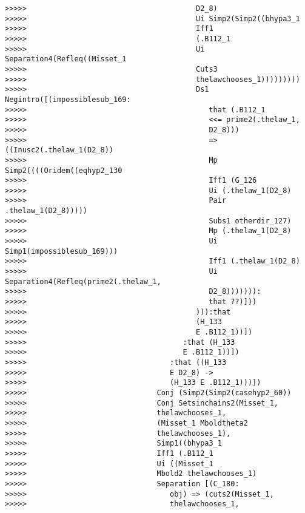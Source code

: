 \documentclass[12pt]{article}
\begin{document}
\begin{verbatim}
>>>>>                                       D2_8)
>>>>>                                       Ui Simp2(Simp2((bhypa3_1
>>>>>                                       Iff1
>>>>>                                       (.B112_1
>>>>>                                       Ui Separation4(Refleq((Misset_1
>>>>>                                       Cuts3
>>>>>                                       thelawchooses_1)))))))))
>>>>>                                       Ds1 Negintro([(impossiblesub_169:
>>>>>                                          that (.B112_1
>>>>>                                          <<= prime2(.thelaw_1,
>>>>>                                          D2_8)))
>>>>>                                          => ((Inusc2(.thelaw_1(D2_8))
>>>>>                                          Mp Simp2((((Oridem((eqhyp2_130
>>>>>                                          Iff1 (G_126
>>>>>                                          Ui (.thelaw_1(D2_8)
>>>>>                                          Pair .thelaw_1(D2_8)))))
>>>>>                                          Subs1 otherdir_127)
>>>>>                                          Mp (.thelaw_1(D2_8)
>>>>>                                          Ui Simp1(impossiblesub_169)))
>>>>>                                          Iff1 (.thelaw_1(D2_8)
>>>>>                                          Ui Separation4(Refleq(prime2(.thelaw_1,
>>>>>                                          D2_8))))))):
>>>>>                                          that ??)]))
>>>>>                                       ))):that
>>>>>                                       (H_133
>>>>>                                       E .B112_1))])
>>>>>                                    :that (H_133
>>>>>                                    E .B112_1))])
>>>>>                                 :that ((H_133
>>>>>                                 E D2_8) ->
>>>>>                                 (H_133 E .B112_1)))])
>>>>>                              Conj (Simp2(Simp2(casehyp2_60))
>>>>>                              Conj Setsinchains2(Misset_1,
>>>>>                              thelawchooses_1,
>>>>>                              (Misset_1 Mboldtheta2
>>>>>                              thelawchooses_1),
>>>>>                              Simp1((bhypa3_1
>>>>>                              Iff1 (.B112_1
>>>>>                              Ui ((Misset_1
>>>>>                              Mbold2 thelawchooses_1)
>>>>>                              Separation [(C_180:
>>>>>                                 obj) => (cuts2(Misset_1,
>>>>>                                 thelawchooses_1,

\end{verbatim}
\end{document}
